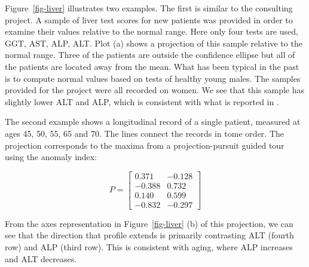 \documentclass[
  12pt]{article}
\begin{document}
Figure~\ref{fig-liver} illustrates two examples. The first is similar to
the consulting project. A sample of liver test scores for new patients
was provided in order to examine their values relative to the normal
range. Here only four tests are used, GGT, AST, ALP, ALT. Plot (a) shows
a projection of this sample relative to the normal range. Three of the
patients are outside the confidence ellipse but all of the patients are
located away from the mean. What has been typical in the past is to
compute normal values based on tests of healthy young males. The samples
provided for the project were all recorded on women. We see that this
sample has slightly lower ALT and ALP, which is consistent with what is
reported in \citet{lib-med-liver-norms}.

The second example shows a longitudinal record of a single patient,
measured at ages 45, 50, 55, 65 and 70. The lines connect the records in
tome order. The projection corresponds to the maxima from a
projection-pursuit guided tour using the anomaly index:

\[
P = \left[ \begin{array}{rr}
            0.371 & -0.128 \\
            -0.388 & 0.732 \\
            0.140 & 0.599 \\
            -0.832 & -0.297 
            \end{array} \right]
\]

From the axes representation in Figure~\ref{fig-liver} (b) of this
projection, we can see that the direction that profile extends is
primarily contrasting ALT (fourth row) and ALP (third row). This is
consistent with aging, where ALP increases and ALT decreases.
\end{document}

